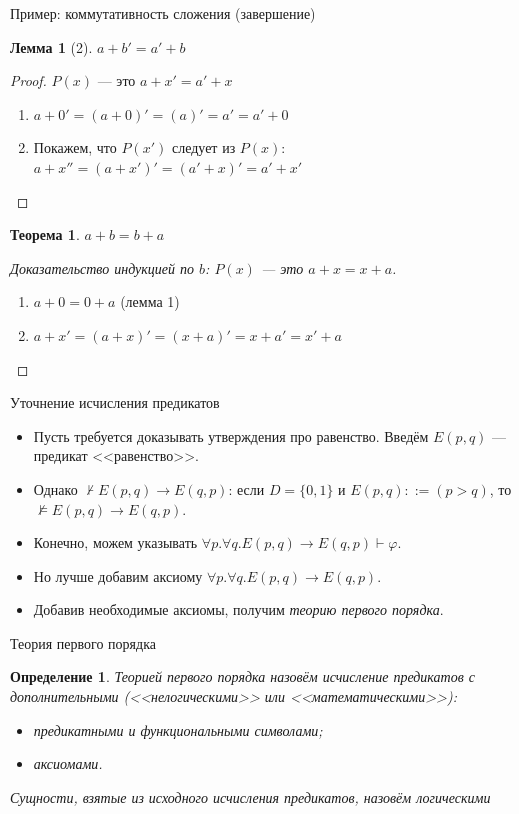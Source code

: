 \documentclass[aspectratio=169]{beamer}
\newtheorem{thm}{Теорема}[section]
\newtheorem{dfn}{Определение}[section]
\newtheorem{lmm}{Лемма}[section]
\begin{document}
\begin{frame}{Пример: коммутативность сложения (завершение)}
\begin{lmm}[2]
$a + b' = a' + b$
\end{lmm}\pause
\begin{proof} $P(x)$ --- это $a + x' = a' + x$\pause
\begin{enumerate}
\item $a + 0' = (a + 0)' = (a)' = a' = a' + 0$\pause
\item Покажем, что $P(x')$ следует из $P(x)$: $a + x'' = (a + x')' = (a' + x)' = a' + x'$
\end{enumerate}
\end{proof}\pause

\begin{thm}
$a + b = b + a$
\end{thm}\pause
\begin{proof}[Доказательство индукцией по $b$: $P(x)$ --- это $a + x = x + a$]
\begin{enumerate}
\item $a + 0 = 0 + a$ (лемма 1)\pause
\item $a + x' = (a + x)' = (x + a)' = x + a' = x' + a$
\end{enumerate}
\end{proof}
\end{frame}

\begin{frame}{Уточнение исчисления предикатов}
\begin{itemize}
\item Пусть требуется доказывать утверждения про равенство. Введём $E(p,q)$ --- предикат <<равенство>>.\pause
\item Однако $\not\vdash E(p,q)\to E(q,p)$: если $D = \{0,1\}$ и $E(p,q) ::= (p>q)$,
то $\not\models E(p,q)\to E(q,p)$.\pause
\item Конечно, можем указывать $\forall p.\forall q.E(p,q)\to E(q,p) \vdash \varphi$.\pause
\item Но лучше добавим аксиому $\forall p.\forall q.E(p,q)\to E(q,p)$.\pause
\item Добавив необходимые аксиомы, получим \emph{теорию первого порядка}.
\end{itemize}
\end{frame}

\begin{frame}{Теория первого порядка}
\begin{dfn}
Теорией первого порядка назовём исчисление предикатов с дополнительными (<<нелогическими>>
или <<математическими>>):
\begin{itemize}
\item предикатными и функциональными символами;
\item аксиомами.
\end{itemize}

Сущности, взятые из исходного исчисления предикатов, назовём \emph{логическими}
\end{dfn}
\end{frame}
\end{document}
